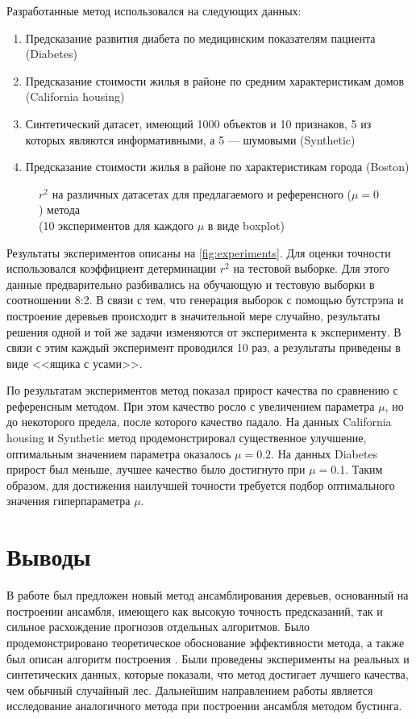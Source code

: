 \documentclass{article}
\begin{document}
Разработанные метод использовался на следующих данных:
\begin{enumerate}
  \item Предсказание развития диабета по медицинским показателям пациента (Diabetes)
  \item Предсказание стоимости жилья в районе по средним характеристикам домов (California housing)
  \item Синтетический датасет, имеющий 1000 объектов и 10 признаков, 5 из которых являются информативными, а 5 --- шумовыми (Synthetic)
  \item Предсказание стоимости жилья в районе по характеристикам города (Boston)
\end{enumerate}

\begin{figure}[h]
  \centering
  
  
  
  
  \caption{$r^2$ на различных датасетах для предлагаемого и референсного ($\mu=0$) метода  \\
  (10 экспериментов для каждого $\mu$ в виде boxplot)}
  \label{fig:experiments}
\end{figure}

Результаты экспериментов описаны на \autoref{fig:experiments}. Для оценки точности использовался коэффициент детерминации $r^2$ на тестовой выборке. Для этого данные предварительно разбивались на обучающую и тестовую выборки в соотношении 8:2. В связи с тем, что генерация выборок с помощью бутстрэпа и построение деревьев происходит в значительной мере случайно, результаты решения одной и той же задачи изменяются от эксперимента к эксперименту. В связи с этим каждый эксперимент проводился 10 раз, а результаты приведены в виде <<ящика с усами>>.

По результатам экспериментов метод показал прирост качества по сравнению с референсным методом. При этом качество росло с увеличением параметра $\mu$, но до некоторого предела, после которого качество падало. На данных California housing и Synthetic метод продемонстрировал существенное улучшение, оптимальным значением параметра оказалось $\mu=0.2$. На данных Diabetes прирост был меньше, лучшее качество было достигнуто при $\mu=0.1$. Таким образом, для достижения наилучшей точности требуется подбор оптимального значения гиперпараметра $\mu$. 

\section{Выводы}
В работе был предложен новый метод ансамблирования деревьев, основанный на построении ансамбля, имеющего как высокую точность предсказаний, так и сильное расхождение прогнозов отдельных алгоритмов. Было продемонстрировано теоретическое обоснование эффективности метода, а также был описан алгоритм построения . Были проведены эксперименты на реальных и синтетических данных, которые показали, что метод достигает лучшего качества, чем обычный случайный лес. Дальнейшим направлением работы является исследование аналогичного метода при построении ансамбля методом бустинга.
\end{document}
